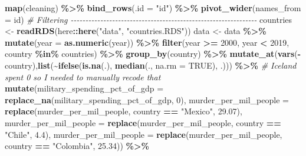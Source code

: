 \documentclass[
  english,
  man,floatsintext]{apa6}
\newenvironment{Shaded}{\begin{snugshade}}{\end{snugshade}}
\newcommand{\CommentTok}[1]{\textcolor[rgb]{0.56,0.35,0.01}{\textit{#1}}}
\newcommand{\DataTypeTok}[1]{\textcolor[rgb]{0.13,0.29,0.53}{#1}}
\newcommand{\DecValTok}[1]{\textcolor[rgb]{0.00,0.00,0.81}{#1}}
\newcommand{\FloatTok}[1]{\textcolor[rgb]{0.00,0.00,0.81}{#1}}
\newcommand{\KeywordTok}[1]{\textcolor[rgb]{0.13,0.29,0.53}{\textbf{#1}}}
\newcommand{\NormalTok}[1]{#1}
\newcommand{\OperatorTok}[1]{\textcolor[rgb]{0.81,0.36,0.00}{\textbf{#1}}}
\newcommand{\OtherTok}[1]{\textcolor[rgb]{0.56,0.35,0.01}{#1}}
\newcommand{\StringTok}[1]{\textcolor[rgb]{0.31,0.60,0.02}{#1}}
\begin{document}
\begin{Shaded}
\begin{Highlighting}[]
\StringTok{  }\KeywordTok{map}\NormalTok{(cleaning) }\OperatorTok{\%\textgreater{}\%}\StringTok{ }
\StringTok{  }\KeywordTok{bind\_rows}\NormalTok{(}\DataTypeTok{.id =} \StringTok{"id"}\NormalTok{) }\OperatorTok{\%\textgreater{}\%}\StringTok{ }
\StringTok{  }\KeywordTok{pivot\_wider}\NormalTok{(}\DataTypeTok{names\_from =}\NormalTok{ id)}
\CommentTok{\# Filtering {-}{-}{-}{-}{-}{-}{-}{-}{-}{-}{-}{-}{-}{-}{-}{-}{-}{-}{-}{-}{-}{-}{-}{-}{-}{-}{-}{-}{-}{-}{-}{-}{-}{-}{-}{-}{-}{-}{-}{-}{-}{-}{-}{-}{-}{-}{-}{-}{-}{-}{-}{-}{-}{-}{-}{-}{-}{-}{-}{-}{-}{-}{-}}
\NormalTok{countries \textless{}{-}}\StringTok{ }\KeywordTok{readRDS}\NormalTok{(here}\OperatorTok{::}\KeywordTok{here}\NormalTok{(}\StringTok{"data"}\NormalTok{, }\StringTok{"countries.RDS"}\NormalTok{))}
\NormalTok{data \textless{}{-}}\StringTok{ }\NormalTok{data }\OperatorTok{\%\textgreater{}\%}
\StringTok{  }\KeywordTok{mutate}\NormalTok{(}\DataTypeTok{year =} \KeywordTok{as.numeric}\NormalTok{(year)) }\OperatorTok{\%\textgreater{}\%}\StringTok{ }
\StringTok{  }\KeywordTok{filter}\NormalTok{(year }\OperatorTok{\textgreater{}=}\StringTok{ }\DecValTok{2000}\NormalTok{, year }\OperatorTok{\textless{}}\StringTok{ }\DecValTok{2019}\NormalTok{, country }\OperatorTok{\%in\%}\StringTok{ }\NormalTok{countries) }\OperatorTok{\%\textgreater{}\%}\StringTok{ }
\StringTok{  }\KeywordTok{group\_by}\NormalTok{(country) }\OperatorTok{\%\textgreater{}\%}
\StringTok{  }\KeywordTok{mutate\_at}\NormalTok{(}\KeywordTok{vars}\NormalTok{(}\OperatorTok{{-}}\NormalTok{country),}\KeywordTok{list}\NormalTok{(}\OperatorTok{\textasciitilde{}}\KeywordTok{ifelse}\NormalTok{(}\KeywordTok{is.na}\NormalTok{(.), }\KeywordTok{median}\NormalTok{(., }\DataTypeTok{na.rm =} \OtherTok{TRUE}\NormalTok{), .))) }\OperatorTok{\%\textgreater{}\%}\StringTok{ }
\CommentTok{\# Iceland spent 0 so I needed to manually recode that}
\StringTok{  }\KeywordTok{mutate}\NormalTok{(}\DataTypeTok{military\_spending\_pct\_of\_gdp =} \KeywordTok{replace\_na}\NormalTok{(military\_spending\_pct\_of\_gdp, }\DecValTok{0}\NormalTok{),}
  \DataTypeTok{murder\_per\_mil\_people =} \KeywordTok{replace}\NormalTok{(murder\_per\_mil\_people, country }\OperatorTok{==}\StringTok{ "Mexico"}\NormalTok{, }\FloatTok{29.07}\NormalTok{),}
         \DataTypeTok{murder\_per\_mil\_people =} \KeywordTok{replace}\NormalTok{(murder\_per\_mil\_people, country }\OperatorTok{==}\StringTok{ "Chile"}\NormalTok{, }\FloatTok{4.4}\NormalTok{),}
         \DataTypeTok{murder\_per\_mil\_people =} \KeywordTok{replace}\NormalTok{(murder\_per\_mil\_people, country }\OperatorTok{==}\StringTok{ "Colombia"}\NormalTok{, }\FloatTok{25.34}\NormalTok{)) }\OperatorTok{\%\textgreater{}\%}\StringTok{ }

\end{Highlighting}
\end{Shaded}
\end{document}
